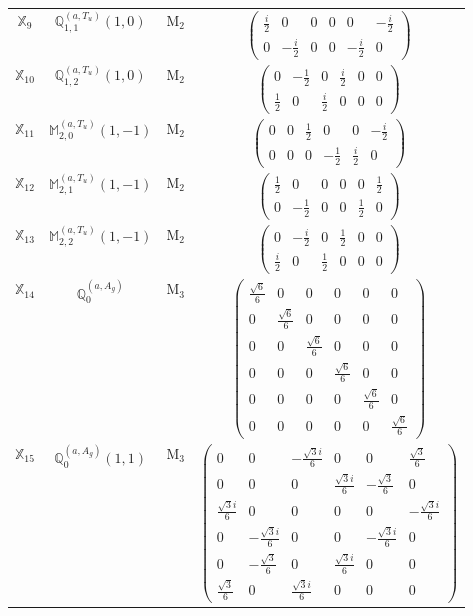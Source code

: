 \documentclass[fleqn,10pt,landscape]{article}
\begin{document}
\begin{itemize}
\begin{center}
\begin{longtable}{c|c|c|c}
$ \mathbb{X}_{9} $ & $\mathbb{Q}_{1,1}^{(a,T_{u})}(1,0)$ & M$_{2}$ & $\begin{pmatrix} \frac{i}{2} & 0 & 0 & 0 & 0 & - \frac{i}{2} \\ 0 & - \frac{i}{2} & 0 & 0 & - \frac{i}{2} & 0 \end{pmatrix}$ \\
$ \mathbb{X}_{10} $ & $\mathbb{Q}_{1,2}^{(a,T_{u})}(1,0)$ & M$_{2}$ & $\begin{pmatrix} 0 & - \frac{1}{2} & 0 & \frac{i}{2} & 0 & 0 \\ \frac{1}{2} & 0 & \frac{i}{2} & 0 & 0 & 0 \end{pmatrix}$ \\
$ \mathbb{X}_{11} $ & $\mathbb{M}_{2,0}^{(a,T_{u})}(1,-1)$ & M$_{2}$ & $\begin{pmatrix} 0 & 0 & \frac{1}{2} & 0 & 0 & - \frac{i}{2} \\ 0 & 0 & 0 & - \frac{1}{2} & \frac{i}{2} & 0 \end{pmatrix}$ \\
$ \mathbb{X}_{12} $ & $\mathbb{M}_{2,1}^{(a,T_{u})}(1,-1)$ & M$_{2}$ & $\begin{pmatrix} \frac{1}{2} & 0 & 0 & 0 & 0 & \frac{1}{2} \\ 0 & - \frac{1}{2} & 0 & 0 & \frac{1}{2} & 0 \end{pmatrix}$ \\
$ \mathbb{X}_{13} $ & $\mathbb{M}_{2,2}^{(a,T_{u})}(1,-1)$ & M$_{2}$ & $\begin{pmatrix} 0 & - \frac{i}{2} & 0 & \frac{1}{2} & 0 & 0 \\ \frac{i}{2} & 0 & \frac{1}{2} & 0 & 0 & 0 \end{pmatrix}$ \\ \hline
$ \mathbb{X}_{14} $ & $\mathbb{Q}_{0}^{(a,A_{g})}$ & M$_{3}$ & $\begin{pmatrix} \frac{\sqrt{6}}{6} & 0 & 0 & 0 & 0 & 0 \\ 0 & \frac{\sqrt{6}}{6} & 0 & 0 & 0 & 0 \\ 0 & 0 & \frac{\sqrt{6}}{6} & 0 & 0 & 0 \\ 0 & 0 & 0 & \frac{\sqrt{6}}{6} & 0 & 0 \\ 0 & 0 & 0 & 0 & \frac{\sqrt{6}}{6} & 0 \\ 0 & 0 & 0 & 0 & 0 & \frac{\sqrt{6}}{6} \end{pmatrix}$ \\
$ \mathbb{X}_{15} $ & $\mathbb{Q}_{0}^{(a,A_{g})}(1,1)$ & M$_{3}$ & $\begin{pmatrix} 0 & 0 & - \frac{\sqrt{3} i}{6} & 0 & 0 & \frac{\sqrt{3}}{6} \\ 0 & 0 & 0 & \frac{\sqrt{3} i}{6} & - \frac{\sqrt{3}}{6} & 0 \\ \frac{\sqrt{3} i}{6} & 0 & 0 & 0 & 0 & - \frac{\sqrt{3} i}{6} \\ 0 & - \frac{\sqrt{3} i}{6} & 0 & 0 & - \frac{\sqrt{3} i}{6} & 0 \\ 0 & - \frac{\sqrt{3}}{6} & 0 & \frac{\sqrt{3} i}{6} & 0 & 0 \\ \frac{\sqrt{3}}{6} & 0 & \frac{\sqrt{3} i}{6} & 0 & 0 & 0 \end{pmatrix}$ \\

\end{longtable}
\end{center}
\end{itemize}
\end{document}
